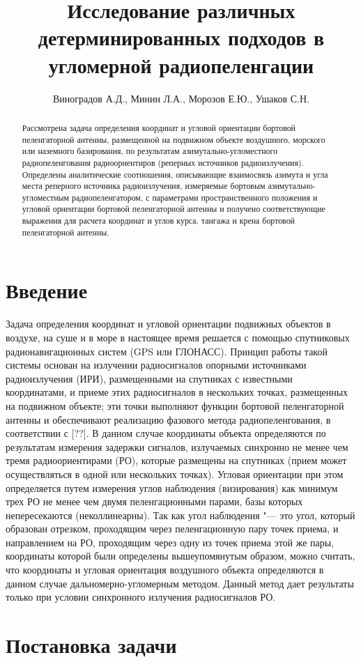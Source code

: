 \documentclass[a4paper,12pt]{article}
\author{Виноградов А.Д., Минин Л.А., Морозов Е.Ю., Ушаков С.Н.}
\title{Исследование различных детерминированных подходов в угломерной радиопеленгации}
\date{}
\begin{document}
\maketitle

\begin{abstract}
Рассмотрена задача определения координат и угловой ориентации бортовой пеленгаторной антенны,
размещенной на подвижном объекте воздушного, морского или наземного базирования, по результатам
азимутально-угломестного радиопеленгования радиоориентиров (реперных источников радиоизлучения).
Определены аналитические соотношения, описывающие взаимосвязь азимута и угла места реперного
источника радиоизлучения, измеряемые бортовым азимутально-угломестным радиопеленгатором,
с параметрами пространственного положения и угловой ориентации бортовой пеленгаторной антенны
и получено соответствующие выражения для расчета координат и углов курса, тангажа и крена бортовой
пеленгаторной антенны.
\end{abstract}

\section*{Введение}
Задача определения координат и угловой ориентации подвижных объектов в воздухе, на суше и в море
в настоящее время решается с помощью спутниковых радионавигационных систем (GPS или ГЛОНАСС). Принцип
работы такой системы основан на излучении радиосигналов опорными источниками радиоизлучения (ИРИ),
размещенными на спутниках с известными координатами, и приеме этих радиосигналов в нескольких точках,
размещенных на подвижном объекте; эти точки выполняют функции бортовой пеленгаторной антенны и обеспечивают
реализацию фазового метода радиопеленгования, в соответствии с [??]. В данном случае координаты
объекта определяются по результатам измерения задержки сигналов, излучаемых синхронно не менее чем
тремя радиоориентирами (РО), которые размещены на спутниках (прием может осуществляться в одной или
нескольких точках). Угловая ориентации при этом определяется путем измерения углов наблюдения (визирования)
как минимум трех РО не менее чем двумя пеленгационными парами, базы которых непересекаются (неколлинеарны).
Так как угол наблюдения "--- это угол, который образован отрезком, проходящим через пеленгационную
пару точек приема, и направлением на РО, проходящим через одну из точек приема этой же пары, координаты которой
были определены вышеупомянутым образом, можно считать, что координаты и угловая ориентация воздушного объекта
определяются в данном случае дальномерно-угломерным методом. Данный метод дает результаты только при условии синхронного излучения радиосигналов РО.
\section{Постановка задачи}

\section{}
\end{document}
